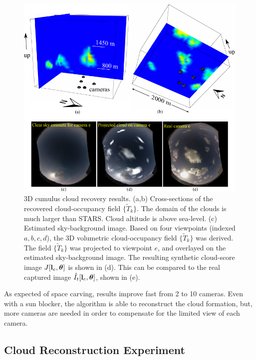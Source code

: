 \documentclass[runningheads]{llncs}
\begin{document}
\begin{figure}[h!]
\begin{center}
   \includegraphics[width=0.95\linewidth]{figures/clouds_reconstructions.pdf}
\end{center}
   \vspace{-0.6cm}
   \caption{3D cumulus cloud recovery results. (a,b) Cross-sections of the recovered cloud-occupancy field $\{\tilde T_k\}$. The domain of the clouds is much larger than STARS. Cloud
   altitude is above sea-level. (c) Estimated sky-background image.  Based on four viewpoints (indexed $a,b,c,d$), the 3D volumetric cloud-occupancy field $\{\tilde T_k\}$ was derived. The field $\{\tilde T_k\}$ was projected to viewpoint $e$, and overlayed on the estimated sky-background image. The resulting synthetic cloud-score image $J[{\bf l}_e,{\bm \theta}]$ is shown in (d). This can be compared to the real captured image $\hat I_t[{\bf l}_e,{\bm \theta}]$, shown in (e).}
\label{fig:projection}
\end{figure}
As expected of space carving,
results improve fast from 2 to 10 cameras. Even with a sun blocker,
the algorithm is able to reconstruct the cloud formation, but, more cameras are needed in order to compensate for the limited view of
each camera.


\subsection*{Cloud Reconstruction Experiment}
\label{sec:results}
\end{document}
